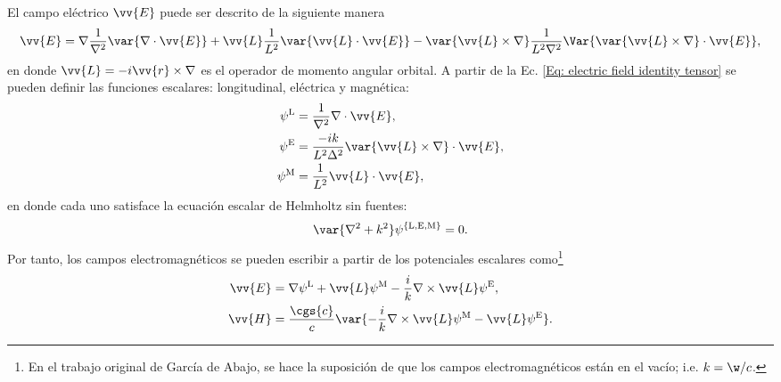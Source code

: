 El campo eléctrico $\vv{E}$ puede ser descrito de la siguiente manera \cite{Low}
\begin{equation}
\vv{E} = \nabla \frac{1}{\nabla^2}\var{\nabla\cdot\vv{E}} + \vv{L}\frac{1}{L^2}\var{\vv{L}\cdot\vv{E}}-\var{\vv{L}\times\nabla}\frac{1}{L^2\nabla^2}\Var{ \var{\vv{L}\times\nabla}\cdot\vv{E}},
\label{Eq: electric field identity tensor}
\end{equation}
en donde $\vv{L}=-i\vv{r}\times\nabla$ es el operador de momento angular orbital. A partir de la Ec. \eqref{Eq: electric field identity tensor} se pueden definir las funciones escalares: longitudinal, eléctrica y magnética: \cite{Low}
\begin{align}
\psi^{\rm L} &= \frac{1}{\nabla^2} \nabla\cdot \vv{E}, \\
\psi^{\rm E} &= \frac{-i k}{L^2 \Delta^2}\var{\vv{L}\times\nabla}\cdot\vv{E}, \\
\psi^{\rm M} &= \frac{1}{L^2}\vv{L}\cdot\vv{E},
\end{align}
en donde cada uno satisface la ecuación escalar de Helmholtz sin fuentes:
\begin{equation}
\var{\nabla^2 + k^2}\psi^{\{\rm L,E,M\}}=0.
\end{equation}
Por tanto, los campos electromagnéticos se pueden escribir a partir de los potenciales escalares como\footnote{En el trabajo original de García de Abajo, se hace la suposición de que los campos electromagnéticos están en el vacío; i.e. $k = \w /c$.}
\begin{align}
\vv{E} &= \nabla\psi^{\rm L} + \vv{L}\psi^{\rm M}-\frac{i}{k}\nabla\times\vv{L}\psi^{\rm E},\\
\vv{H} &= \frac{\cgs{c}}{c}\var{-\frac{i}{k}\nabla\times\vv{L}\psi^{\rm M}-\vv{L}\psi^{\rm E}}.
\end{align} 

